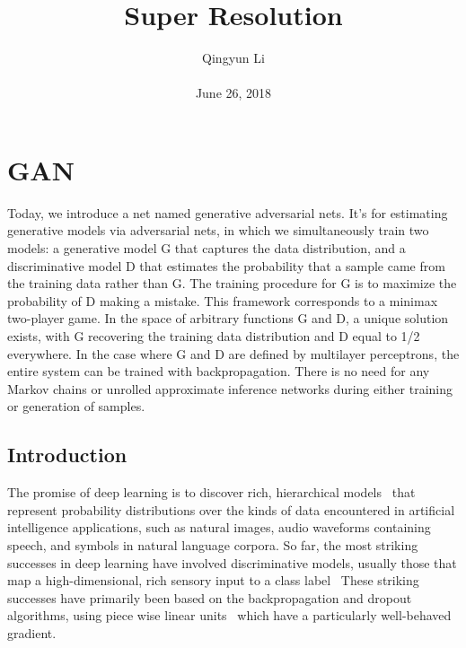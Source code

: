 \documentclass[10pt,twocolumn,letterpaper]{article}
\begin{document}
\author{Qingyun Li\\\\
June 26, 2018}        
\title{Super Resolution}

\maketitle

\section{GAN}
\par Today, we introduce a net named generative adversarial nets. It's for estimating generative models via adversarial nets, in which we simultaneously train two models: a generative model G that captures the data distribution, and a discriminative model D that estimates the probability that a sample came from the training data rather than G. The training procedure for G is to maximize the probability of D making a mistake. This framework corresponds to a minimax two-player game. In the space of arbitrary functions G and D, a unique solution exists, with G recovering the training data distribution and D equal to 1/2 everywhere. In the case where G and D are defined by multilayer perceptrons, the entire system can be trained with backpropagation. There is no need for any Markov chains or unrolled approximate inference networks during either training or generation of samples.
\subsection{Introduction}
\par The promise of deep learning is to discover rich, hierarchical models~\cite{Bengio2009Learning} that represent probability distributions over the kinds of data encountered in artificial intelligence applications, such as natural images, audio waveforms containing speech, and  symbols in natural language corpora. So far, the most striking successes in deep learning have involved discriminative models, usually those that map a high-dimensional, rich sensory input to a class label~\cite{Hinton2012Deep} These striking successes have primarily been based on the backpropagation and dropout algorithms, using piece wise linear units~\cite{Glorot2011Deep} which have a particularly well-behaved gradient.
  
 
\end{document}
